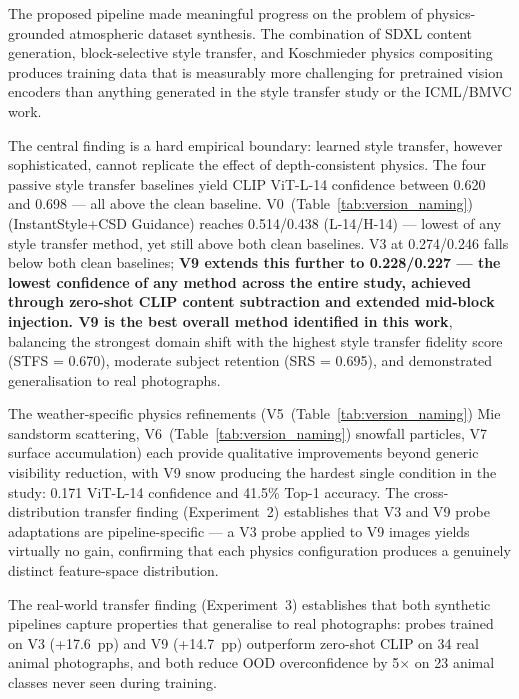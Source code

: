 \noindent The proposed pipeline made meaningful progress on the problem of physics-grounded atmospheric dataset synthesis. The combination of SDXL content generation, block-selective style transfer, and Koschmieder physics compositing produces training data that is measurably more challenging for pretrained vision encoders than anything generated in the style transfer study or the ICML/BMVC work.

\noindent The central finding is a hard empirical boundary: learned style transfer, however sophisticated, cannot replicate the effect of depth-consistent physics. The four passive style transfer baselines yield CLIP ViT-L-14 confidence between 0.620 and 0.698 --- all above the clean baseline. V0~(Table~\ref{tab:version_naming}) (InstantStyle+CSD Guidance) reaches 0.514/0.438 (L-14/H-14) --- lowest of any style transfer method, yet still above both clean baselines. V3 at 0.274/0.246 falls below both clean baselines; \textbf{V9 extends this further to 0.228/0.227 --- the lowest confidence of any method across the entire study, achieved through zero-shot CLIP content subtraction and extended mid-block injection. V9 is the best overall method identified in this work}, balancing the strongest domain shift with the highest style transfer fidelity score (STFS = 0.670), moderate subject retention (SRS = 0.695), and demonstrated generalisation to real photographs.

\noindent The weather-specific physics refinements (V5~(Table~\ref{tab:version_naming}) Mie sandstorm scattering, V6~(Table~\ref{tab:version_naming}) snowfall particles, V7 surface accumulation) each provide qualitative improvements beyond generic visibility reduction, with V9 snow producing the hardest single condition in the study: 0.171 ViT-L-14 confidence and 41.5\% Top-1 accuracy. The cross-distribution transfer finding (Experiment~2) establishes that V3 and V9 probe adaptations are pipeline-specific — a V3 probe applied to V9 images yields virtually no gain, confirming that each physics configuration produces a genuinely distinct feature-space distribution.

\noindent The real-world transfer finding (Experiment~3) establishes that both synthetic pipelines capture properties that generalise to real photographs: probes trained on V3 (+17.6~pp) and V9 (+14.7~pp) outperform zero-shot CLIP on 34 real animal photographs, and both reduce OOD overconfidence by 5$\times$ on 23 animal classes never seen during training.

